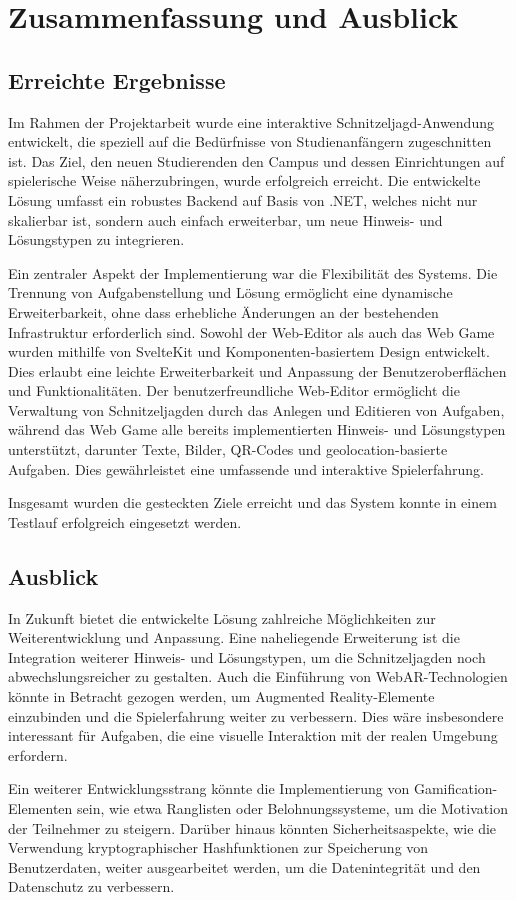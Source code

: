\chapter{Zusammenfassung und Ausblick}
\label{cha:zusammenfassung}
\section{Erreichte Ergebnisse}
\label{sec:ergebnisse}

Im Rahmen der Projektarbeit wurde eine interaktive Schnitzeljagd-Anwendung entwickelt, die speziell auf die Bedürfnisse von Studienanfängern zugeschnitten ist. Das Ziel, den neuen Studierenden den Campus und dessen Einrichtungen auf spielerische Weise näherzubringen, wurde erfolgreich erreicht. Die entwickelte Lösung umfasst ein robustes Backend auf Basis von .NET, welches nicht nur skalierbar ist, sondern auch einfach erweiterbar, um neue Hinweis- und Lösungstypen zu integrieren.

Ein zentraler Aspekt der Implementierung war die Flexibilität des Systems. Die Trennung von Aufgabenstellung und Lösung ermöglicht eine dynamische Erweiterbarkeit, ohne dass erhebliche Änderungen an der bestehenden Infrastruktur erforderlich sind. Sowohl der Web-Editor als auch das Web Game wurden mithilfe von SvelteKit und Komponenten-basiertem Design entwickelt. Dies erlaubt eine leichte Erweiterbarkeit und Anpassung der Benutzeroberflächen und Funktionalitäten. Der benutzerfreundliche Web-Editor ermöglicht die Verwaltung von Schnitzeljagden durch das Anlegen und Editieren von Aufgaben, während das Web Game alle bereits implementierten Hinweis- und Lösungstypen unterstützt, darunter Texte, Bilder, QR-Codes und geolocation-basierte Aufgaben. Dies gewährleistet eine umfassende und interaktive Spielerfahrung.

Insgesamt wurden die gesteckten Ziele erreicht und das System konnte in einem Testlauf erfolgreich eingesetzt werden.

\section{Ausblick}
\label{sec:ausblick}

In Zukunft bietet die entwickelte Lösung zahlreiche Möglichkeiten zur Weiterentwicklung und Anpassung. Eine naheliegende Erweiterung ist die Integration weiterer Hinweis- und Lösungstypen, um die Schnitzeljagden noch abwechslungsreicher zu gestalten. Auch die Einführung von WebAR-Technologien könnte in Betracht gezogen werden, um Augmented Reality-Elemente einzubinden und die Spielerfahrung weiter zu verbessern. Dies wäre insbesondere interessant für Aufgaben, die eine visuelle Interaktion mit der realen Umgebung erfordern.

Ein weiterer Entwicklungsstrang könnte die Implementierung von Gamification-Elementen sein, wie etwa Ranglisten oder Belohnungssysteme, um die Motivation der Teilnehmer zu steigern. Darüber hinaus könnten Sicherheitsaspekte, wie die Verwendung kryptographischer Hashfunktionen zur Speicherung von Benutzerdaten, weiter ausgearbeitet werden, um die Datenintegrität und den Datenschutz zu verbessern.